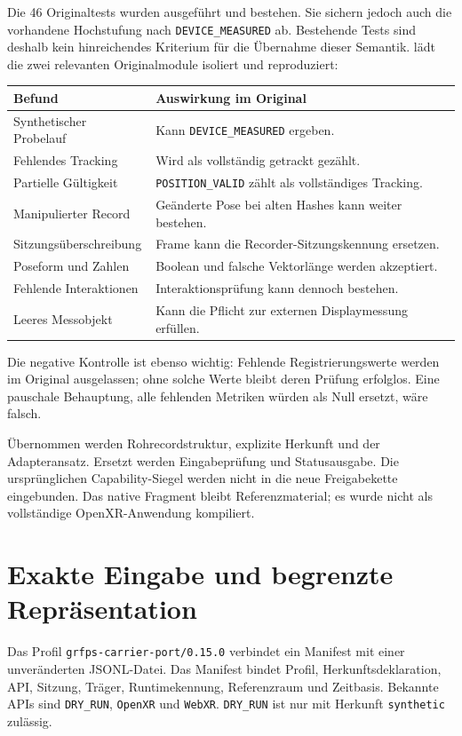 \documentclass[11pt,a4paper]{article}
\newcommand{\nextsection}[2]{\clearpage{\color{accent}\small\textsf{#1}}\section{#2}}
\begin{document}
Die 46 Originaltests wurden ausgeführt und bestehen. Sie sichern
jedoch auch die vorhandene Hochstufung nach \texttt{DEVICE\_MEASURED}
ab. Bestehende Tests sind deshalb kein hinreichendes Kriterium für
die Übernahme dieser Semantik. 
lädt die zwei relevanten Originalmodule isoliert und reproduziert:

\begin{tabularx}{\linewidth}{@{}lY@{}}\toprule
Befund & Auswirkung im Original\\\midrule
Synthetischer Probelauf & Kann \texttt{DEVICE\_MEASURED} ergeben.\\
Fehlendes Tracking & Wird als vollständig getrackt gezählt.\\
Partielle Gültigkeit & \texttt{POSITION\_VALID} zählt als vollständiges Tracking.\\
Manipulierter Record & Geänderte Pose bei alten Hashes kann weiter bestehen.\\
Sitzungsüberschreibung & Frame kann die Recorder-Sitzungskennung ersetzen.\\
Poseform und Zahlen & Boolean und falsche Vektorlänge werden akzeptiert.\\
Fehlende Interaktionen & Interaktionsprüfung kann dennoch bestehen.\\
Leeres Messobjekt & Kann die Pflicht zur externen Displaymessung erfüllen.\\\bottomrule
\end{tabularx}

Die negative Kontrolle ist ebenso wichtig: Fehlende Registrierungswerte
werden im Original ausgelassen; ohne solche Werte bleibt deren
Prüfung erfolglos. Eine pauschale Behauptung, alle fehlenden Metriken
würden als Null ersetzt, wäre falsch.

Übernommen werden Rohrecordstruktur, explizite Herkunft und der
Adapteransatz. Ersetzt werden Eingabeprüfung und Statusausgabe.
Die ursprünglichen Capability-Siegel werden nicht in die neue
Freigabekette eingebunden. Das native Fragment bleibt Referenzmaterial;
es wurde nicht als vollständige OpenXR-Anwendung kompiliert.

\nextsection{84 / TRÄGERVERTRAG}{Exakte Eingabe und begrenzte Repräsentation}
Das Profil \texttt{grfps-carrier-port/0.15.0} verbindet ein Manifest
mit einer unveränderten JSONL-Datei. Das Manifest bindet Profil,
Herkunftsdeklaration, API, Sitzung, Träger, Runtimekennung,
Referenzraum und Zeitbasis. Bekannte APIs sind \texttt{DRY\_RUN},
\texttt{OpenXR} und \texttt{WebXR}. \texttt{DRY\_RUN} ist nur
mit Herkunft \texttt{synthetic} zulässig.
\end{document}
